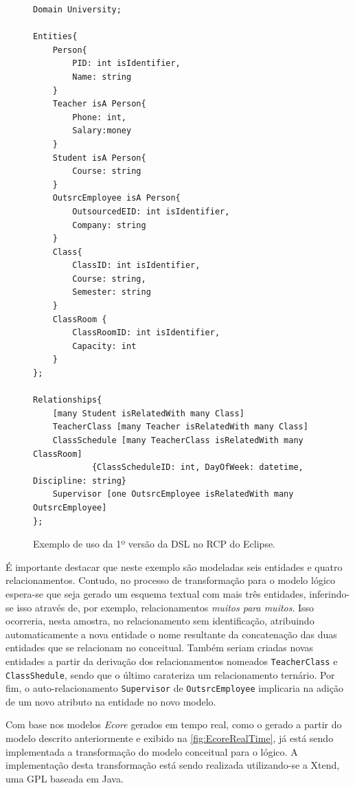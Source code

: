 \begin{figure}[!htb]
\centering
\caption{Exemplo de uso da 1º versão da DSL no RCP do Eclipse.}
\label{fig:DSLvs1Uso}
\begin{scriptsize}
\begin{lstlisting}[language = ERDSL, frame = trbl]
Domain University;

Entities{
	Person{ 
		PID: int isIdentifier, 
		Name: string
	}
	Teacher isA Person{ 
		Phone: int,
		Salary:money
	}
	Student isA Person{ 
		Course: string
	} 	
	OutsrcEmployee isA Person{
	    OutsourcedEID: int isIdentifier,
	    Company: string
	}
	Class{
		ClassID: int isIdentifier,
		Course: string,
		Semester: string
	}
	ClassRoom {
		ClassRoomID: int isIdentifier,
		Capacity: int
	}
};

Relationships{	 
	[many Student isRelatedWith many Class]
	TeacherClass [many Teacher isRelatedWith many Class]
	ClassSchedule [many TeacherClass isRelatedWith many ClassRoom]
	        {ClassScheduleID: int, DayOfWeek: datetime, Discipline: string}
	Supervisor [one OutsrcEmployee isRelatedWith many OutsrcEmployee]
};
\end{lstlisting}
\end{scriptsize}
\end{figure}
É importante destacar que neste exemplo são modeladas seis entidades e quatro relacionamentos. 
Contudo, no processo de transformação para o modelo lógico espera-se que seja gerado um esquema textual com mais três entidades, inferindo-se isso através de, por exemplo, relacionamentos \textit{muitos para muitos}. 
Isso ocorreria, nesta amostra, no relacionamento sem identificação, atribuindo automaticamente a nova entidade o nome resultante da concatenação das duas entidades que se relacionam no conceitual. 
Também seriam criadas novas entidades a partir da derivação dos relacionamentos nomeados \texttt{TeacherClass} e \texttt{ClassShedule}, sendo que o último carateriza um relacionamento ternário.
Por fim, o auto-relacionamento \texttt{Supervisor} de \texttt{OutsrcEmployee} implicaria na adição de um novo atributo na entidade no novo modelo.

Com base nos modelos \textit{Ecore} gerados em tempo real, como o gerado a partir do modelo descrito anteriormente e exibido na \autoref{fig:EcoreRealTime}, já está sendo implementada a transformação do modelo conceitual para o lógico. 
A implementação desta transformação está sendo realizada utilizando-se a Xtend, uma \ac{GPL} baseada em Java.

